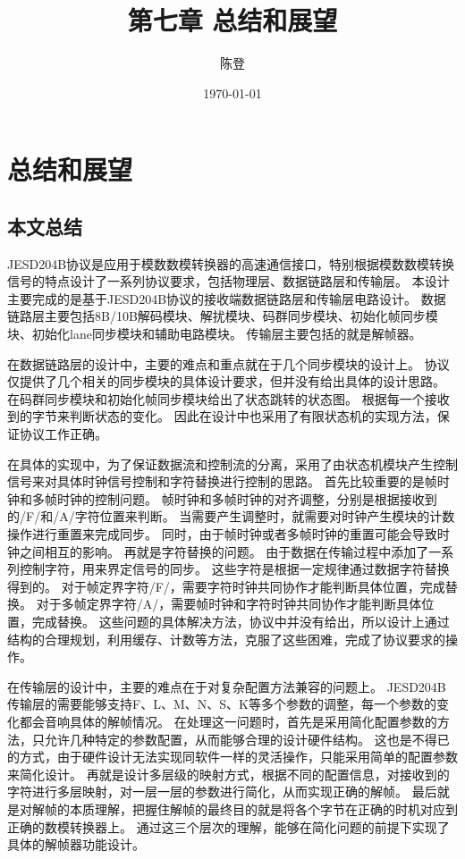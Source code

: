 \documentclass[UTF8]{ctexart}
\title{第七章 总结和展望}
\author{陈登}
\date{\today}
\begin{document}
\section{总结和展望}

\subsection{本文总结}

JESD204B协议是应用于模数数模转换器的高速通信接口，特别根据模数数模转换信号的特点设计了一系列协议要求，包括物理层、数据链路层和传输层。
本设计主要完成的是基于JESD204B协议的接收端数据链路层和传输层电路设计。
数据链路层主要包括8B/10B解码模块、解扰模块、码群同步模块、初始化帧同步模块、初始化lane同步模块和辅助电路模块。
传输层主要包括的就是解帧器。

在数据链路层的设计中，主要的难点和重点就在于几个同步模块的设计上。
协议仅提供了几个相关的同步模块的具体设计要求，但并没有给出具体的设计思路。
在码群同步模块和初始化帧同步模块给出了状态跳转的状态图。
根据每一个接收到的字节来判断状态的变化。
因此在设计中也采用了有限状态机的实现方法，保证协议工作正确。

在具体的实现中，为了保证数据流和控制流的分离，采用了由状态机模块产生控制信号来对具体时钟信号控制和字符替换进行控制的思路。
首先比较重要的是帧时钟和多帧时钟的控制问题。
帧时钟和多帧时钟的对齐调整，分别是根据接收到的/F/和/A/字符位置来判断。
当需要产生调整时，就需要对时钟产生模块的计数操作进行重置来完成同步。
同时，由于帧时钟或者多帧时钟的重置可能会导致时钟之间相互的影响。
再就是字符替换的问题。
由于数据在传输过程中添加了一系列控制字符，用来界定信号的同步。
这些字符是根据一定规律通过数据字符替换得到的。
对于帧定界字符/F/，需要字符时钟共同协作才能判断具体位置，完成替换。
对于多帧定界字符/A/，需要帧时钟和字符时钟共同协作才能判断具体位置，完成替换。
这些问题的具体解决方法，协议中并没有给出，所以设计上通过结构的合理规划，利用缓存、计数等方法，克服了这些困难，完成了协议要求的操作。

在传输层的设计中，主要的难点在于对复杂配置方法兼容的问题上。
JESD204B传输层的需要能够支持F、L、M、N、S、K等多个参数的调整，每一个参数的变化都会音响具体的解帧情况。
在处理这一问题时，首先是采用简化配置参数的方法，只允许几种特定的参数配置，从而能够合理的设计硬件结构。
这也是不得已的方式，由于硬件设计无法实现同软件一样的灵活操作，只能采用简单的配置参数来简化设计。
再就是设计多层级的映射方式，根据不同的配置信息，对接收到的字符进行多层映射，对一层一层的参数进行简化，从而实现正确的解帧。
最后就是对解帧的本质理解，把握住解帧的最终目的就是将各个字节在正确的时机对应到正确的数模转换器上。
通过这三个层次的理解，能够在简化问题的前提下实现了具体的解帧器功能设计。
\end{document}
